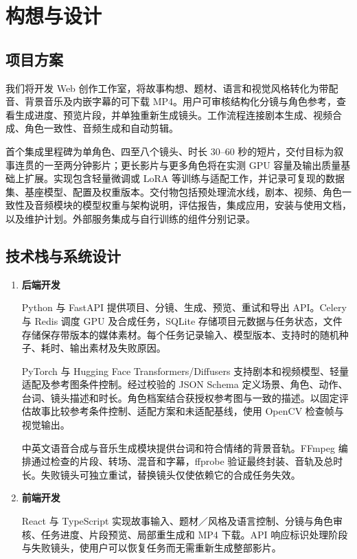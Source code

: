 \documentclass[a4paper,12pt]{article}
\begin{document}
\newpage

\section{构想与设计}
\subsection{项目方案}
我们将开发 Web 创作工作室，将故事构想、题材、语言和视觉风格转化为带配音、背景音乐及内嵌字幕的可下载 MP4。用户可审核结构化分镜与角色参考，查看生成进度、预览片段，并单独重新生成镜头。工作流程连接剧本生成、视频合成、角色一致性、音频生成和自动剪辑。

首个集成里程碑为单角色、四至八个镜头、时长 30--60 秒的短片，交付目标为叙事连贯的一至两分钟影片；更长影片与更多角色将在实测 GPU 容量及输出质量基础上扩展。实现包含轻量微调或 LoRA 等训练与适配工作，并记录可复现的数据集、基座模型、配置及权重版本。交付物包括预处理流水线，剧本、视频、角色一致性及音频模块的模型权重与架构说明，评估报告，集成应用，安装与使用文档，以及维护计划。外部服务集成与自行训练的组件分别记录。

\subsection{技术栈与系统设计}
\begin{enumerate}
  \item \textbf{后端开发}\par
  Python 与 FastAPI 提供项目、分镜、生成、预览、重试和导出 API。Celery 与 Redis 调度 GPU 及合成任务，SQLite 存储项目元数据与任务状态，文件存储保存带版本的媒体素材。每个任务记录输入、模型版本、支持时的随机种子、耗时、输出素材及失败原因。

  PyTorch 与 Hugging Face Transformers/Diffusers 支持剧本和视频模型、轻量适配及参考图条件控制。经过校验的 JSON Schema 定义场景、角色、动作、台词、镜头描述和时长。角色档案结合获授权参考图与一致的描述。以固定评估故事比较参考条件控制、适配方案和未适配基线，使用 OpenCV 检查帧与视觉输出。

  中英文语音合成与音乐生成模块提供台词和符合情绪的背景音轨。FFmpeg 编排通过检查的片段、转场、混音和字幕，ffprobe 验证最终封装、音轨及总时长。失败镜头可独立重试，替换镜头仅使依赖它的合成任务失效。

  \item \textbf{前端开发}\par
  React 与 TypeScript 实现故事输入、题材／风格及语言控制、分镜与角色审核、任务进度、片段预览、局部重生成和 MP4 下载。API 响应标识处理阶段与失败镜头，使用户可以恢复任务而无需重新生成整部影片。
\end{enumerate}
\end{document}
